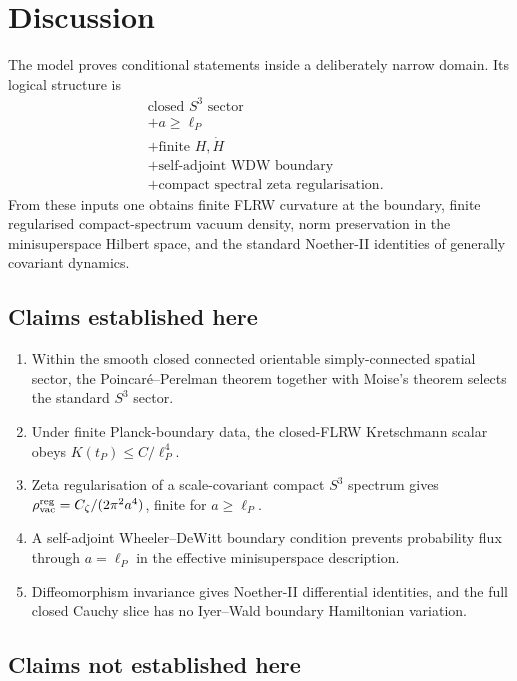 \documentclass[reprint,aps,prd,letterpaper,superscriptaddress,nofootinbib,longbibliography,floatfix]{revtex4-2}
\theoremstyle{remark}
\newcommand{\Czeta}{C_\zeta}
\begin{document}
\section{Discussion}

The model proves conditional statements inside a deliberately narrow domain.  Its
logical structure is
\[
\begin{aligned}
  &\text{closed }S^3\text{ sector}\\
  &+ a\ge \ell_P\\
  &+ \text{finite }H,\dot H\\
  &+ \text{self-adjoint WDW boundary}\\
  &+ \text{compact spectral zeta regularisation}.
\end{aligned}
\]
From these inputs one obtains finite FLRW curvature at the boundary, finite
regularised compact-spectrum vacuum density, norm preservation in the
minisuperspace Hilbert space, and the standard Noether-II identities of
generally covariant dynamics.

\subsection{Claims established here}

\begin{enumerate}
\item Within the smooth closed connected orientable simply-connected spatial
sector, the Poincar\'e--Perelman theorem together with Moise's theorem selects
the standard \(S^3\) sector.
\item Under finite Planck-boundary data, the closed-FLRW Kretschmann scalar
obeys \(K(t_P)\le C/\ell_P^4\).
\item Zeta regularisation of a scale-covariant compact \(S^3\) spectrum gives
\(\rho_{\rm vac}^{\rm reg}=\Czeta/(2\pi^2a^4)\), finite for
\(a\ge\ell_P\).
\item A self-adjoint Wheeler--DeWitt boundary condition prevents probability
flux through \(a=\ell_P\) in the effective minisuperspace description.
\item Diffeomorphism invariance gives Noether-II differential identities, and
the full closed Cauchy slice has no Iyer--Wald boundary Hamiltonian variation.
\end{enumerate}

\subsection{Claims not established here}
\end{document}
